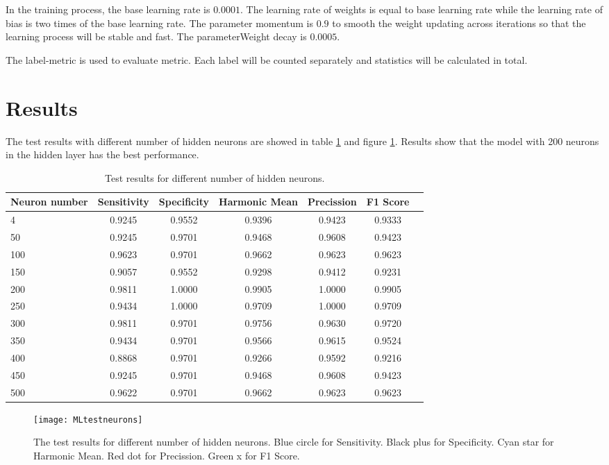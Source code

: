 In the training process, the base learning rate is $0.0001$. The learning rate of weights is equal to base learning rate while the learning rate of bias is two times of the base learning rate. The parameter momentum is $0.9$ to smooth the weight updating across iterations so that the learning process will be stable and fast. The parameterWeight decay is $0.0005$.

The label-metric is used to evaluate metric. Each label will be counted separately and statistics will be calculated in total.

\section{Results}

The test results with different number of hidden neurons are showed in table \ref{tb:tMLtestneurons} and figure \ref{fig:MLtestneurons}. Results show that the model with 200 neurons in the hidden layer has the best performance.
\begin{table}
\centering
\begin{tabular}{l*{6}{c}}
Neuron number              & Sensitivity & Specificity & Harmonic Mean & Precission & F1 Score  \\
\hline
4 				& 0.9245 & 0.9552 & 0.9396 & 0.9423 & 0.9333   \\
50              & 0.9245 & 0.9701 & 0.9468 & 0.9608 & 0.9423   \\
100             & 0.9623 & 0.9701 & 0.9662 & 0.9623 &  0.9623  \\
150             & 0.9057 & 0.9552 & 0.9298 & 0.9412 &  0.9231   \\
200             & 0.9811 & 1.0000 & 0.9905 & 1.0000 &  0.9905   \\
250             & 0.9434 & 1.0000 & 0.9709 & 1.0000 &  0.9709   \\
300             & 0.9811 & 0.9701 & 0.9756 & 0.9630 &  0.9720   \\
350             & 0.9434 & 0.9701 & 0.9566 & 0.9615 &  0.9524   \\
400             & 0.8868 & 0.9701 & 0.9266 & 0.9592 &  0.9216   \\
450             & 0.9245 & 0.9701 & 0.9468 & 0.9608 &  0.9423   \\
500             & 0.9622 & 0.9701 & 0.9662 & 0.9623 &  0.9623   \\
\end{tabular}
\caption{\label{tb:tMLtestneurons}Test results for different number of hidden neurons.}
\end{table}
\begin{figure}[htb]
\centering
\texttt{[image: MLtestneurons]}
\caption{\label{fig:MLtestneurons}The test results for different number of hidden neurons. Blue circle for Sensitivity. Black plus for Specificity. Cyan star for Harmonic Mean. Red dot for Precission. Green x for  F1 Score.}
\end{figure}


